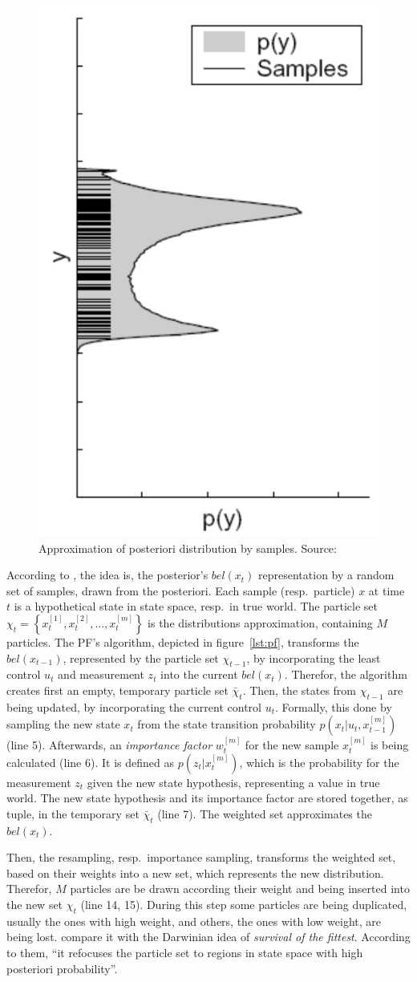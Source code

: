 \begin{figure}
	\includegraphics[height=0.45\textwidth]{figures/pf_approx}
	\caption{Approximation of posteriori distribution by samples. Source: \citep{thrun:prob_robo}}
	\label{fig:pf_approx}
\end{figure} 

According to \citet{thrun:prob_robo}, the idea is, the posterior's $bel(x_t)$ representation by a random set of samples, drawn from the posteriori. Each sample (resp.\ particle) $x$ at time $t$ is a hypothetical state in state space, resp.\ in true world. The particle set $\chi_t = \left\{ x^{[1]}_t, x^{[2]}_t, \ldots, x^{[m]}_t \right\}$ is the distributions approximation, containing $M$ particles. The \acs{PF}'s algorithm, depicted in figure~\ref{lst:pf}, transforms the $bel(x_{t-1})$, represented by the particle set $\chi_{t-1}$, by incorporating the least control $u_t$ and measurement $z_t$ into the current $bel(x_t)$. Therefor, the algorithm creates first an empty, temporary particle set $\bar{\chi}_t$. Then, the states from $\chi_{t-1}$ are being updated, by incorporating the current control $u_t$. Formally, this done by sampling the new state $x_t$ from the state transition probability $p(x_t|u_t, x^{[m]}_{t-1})$ (line 5). Afterwards, an \emph{importance factor} $w^{[m]}_t$ for the new sample $x^{[m]}_t$ is being calculated (line 6). It is defined as $p(z_t|x^{[m]}_t)$, which is the probability for the measurement $z_t$ given the new state hypothesis, representing a value in true world. The new state hypothesis and its importance factor are stored together, as tuple, in the temporary set $\bar{\chi}_t$ (line 7). The weighted set approximates the $bel(x_t)$.

 Then, the resampling, resp.\ importance sampling, transforms the weighted set, based on their weights into a new set, which represents the new distribution. Therefor, $M$ particles are be drawn according their weight and being inserted into the new set $\chi_t$ (line 14, 15). During this step some particles are being duplicated, usually the ones with high weight, and others, the ones with low weight, are being lost. \citet{thrun:prob_robo} compare it with the Darwinian idea of \emph{survival of the fittest}. According to them, ``it refocuses the particle set to regions in state space with high posteriori probability''.
 
